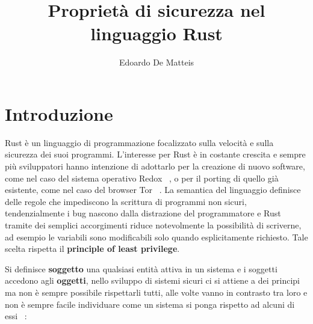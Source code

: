 \documentclass[Lau,binding=0.6cm]{sapthesis}
\title{Proprietà di sicurezza nel linguaggio Rust}
\author{Edoardo De Matteis}
\begin{document}
\frontmatter

\maketitle




\tableofcontents


\mainmatter

\chapter{Introduzione}
Rust è un linguaggio di programmazione focalizzato sulla velocità e sulla sicurezza dei suoi programmi.
L'interesse per Rust è in costante crescita e sempre più sviluppatori hanno intenzione di adottarlo per la creazione di nuovo software, come nel caso del sistema operativo Redox ~\cite{redox}, o per il porting di quello già esistente, come nel caso del browser Tor ~\cite{tor}.
La semantica del linguaggio definisce delle regole che impediscono la scrittura di programmi non sicuri, tendenzialmente i bug nascono dalla distrazione del programmatore e Rust tramite dei semplici accorgimenti riduce notevolmente la possibilità di scriverne, ad esempio le variabili sono modificabili solo quando esplicitamente richiesto.
Tale scelta rispetta il \textbf{principle of least privilege}.


Si definisce \textbf{soggetto} una qualsiasi entità attiva in un sistema e i soggetti accedono agli \textbf{oggetti}, nello sviluppo di sistemi sicuri ci si attiene a dei principi ma non è sempre possibile rispettarli tutti, alle volte vanno in contrasto tra loro e non è sempre facile individuare come un sistema si ponga rispetto ad alcuni di essi ~\cite{gollmann:computersecurity}:
\end{document}
